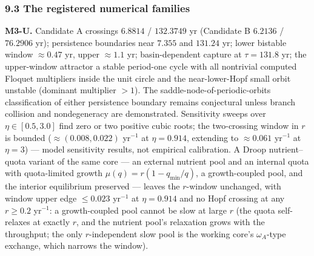 \documentclass[11pt]{article}
\begin{document}
\subsubsection{9.3 The registered numerical
families}\label{the-registered-numerical-families}

\textbf{M3-U.} Candidate A crossings \(6.8814\) / \(132.3749\) yr
(Candidate B \(6.2136\) / \(76.2906\) yr); persistence boundaries near
\(7.355\) and \(131.24\) yr; lower bistable window \(\approx0.47\) yr,
upper \(\approx1.1\) yr; basin-dependent capture at \(\tau = 131.8\) yr;
the upper-window attractor a stable period-one cycle with all nontrivial
computed Floquet multipliers inside the unit circle and the
near-lower-Hopf small orbit unstable (dominant multiplier \(>1\)). The
saddle-node-of-periodic-orbits classification of either persistence
boundary remains conjectural unless branch collision and nondegeneracy
are demonstrated. Sensitivity sweeps over \(\eta \in [0.5, 3.0]\) find
zero or two positive cubic roots; the two-crossing window in \(r\) is
bounded (\(\approx(0.008, 0.022)\) yr\(^{-1}\) at \(\eta = 0.914\),
extending to \(\approx0.061\) yr\(^{-1}\) at \(\eta = 3\)) --- model
sensitivity results, not empirical calibration. A Droop nutrient--quota
variant of the same core --- an external nutrient pool and an internal
quota with quota-limited growth \(\mu(q) = r(1 - q_{\min}/q)\), a
growth-coupled pool, and the interior equilibrium preserved --- leaves
the \(r\)-window unchanged, with window upper edge \(\le 0.023\)
yr\(^{-1}\) at \(\eta = 0.914\) and no Hopf crossing at any
\(r \ge 0.2\) yr\(^{-1}\): a growth-coupled pool cannot be slow at large
\(r\) (the quota self-relaxes at exactly \(r\), and the nutrient pool's
relaxation grows with the throughput; the only \(r\)-independent slow
pool is the working core's \(\omega_A\)-type exchange, which narrows the
window).
\end{document}
